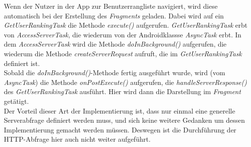 Wenn der Nutzer in der App zur Benutzerrangliste navigiert, wird diese automatisch bei der Erstellung des \emph{Fragments} geladen. Dabei wird auf ein \emph{GetUserRankingTask} die Methode \emph{execute()} aufgerufen. \emph{GetUserRankingTask} erbt von \emph{AccessServerTask}, die wiederum von der Androidklassse \emph{AsyncTask} erbt. In dem \emph{AccessServerTask} wird die Methode \emph{doInBackground()} aufgerufen, die wiederum die Methode \emph{createServerRequest} aufruft, die im \emph{GetUserRankingTask} definiert ist.\\
Sobald die \emph{doInBackground()}-Methode fertig ausgeführt wurde, wird (vom \emph{AsyncTask}) die Methode \emph{onPostExecute()} aufgerufen, die \emph{handleServerResponse()} des \emph{GetUserRankingTask} ausführt. Hier wird dann die Darstellung im \emph{Fragment} getätigt.\\
Der Vorteil dieser Art der Implementierung ist, dass nur einmal eine generelle Serverabfrage definiert werden muss, und sich keine weitere Gedanken um dessen Implementierung gemacht werden m\"ussen. Deswegen ist die Durchführung der HTTP-Abfrage hier auch nicht weiter aufgeführt.